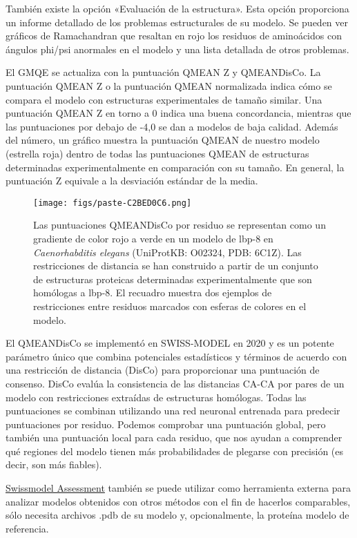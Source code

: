 También existe la opción «Evaluación de la estructura». Esta opción proporciona un informe detallado de los problemas estructurales de su modelo. Se pueden ver gráficos de Ramachandran que resaltan en rojo los residuos de aminoácidos con ángulos phi/psi anormales en el modelo y una lista detallada de otros problemas.

El GMQE se actualiza con la puntuación QMEAN Z y QMEANDisCo. La puntuación QMEAN Z o la puntuación QMEAN normalizada indica cómo se compara el modelo con estructuras experimentales de tamaño similar. Una puntuación QMEAN Z en torno a 0 indica una buena concordancia, mientras que las puntuaciones por debajo de -4,0 se dan a modelos de baja calidad. Además del número, un gráfico muestra la puntuación QMEAN de nuestro modelo (estrella roja) dentro de todas las puntuaciones QMEAN de estructuras determinadas experimentalmente en comparación con su tamaño. En general, la puntuación Z equivale a la desviación estándar de la media.

\begin{figure}[h]
\centering
\texttt{[image: figs/paste-C2BED0C6.png]}
\caption{Las puntuaciones QMEANDisCo por residuo se representan como un gradiente de color rojo a verde en un modelo de lbp-8 en \textit{Caenorhabditis elegans} (UniProtKB: O02324, PDB: 6C1Z). Las restricciones de distancia se han construido a partir de un conjunto de estructuras proteicas determinadas experimentalmente que son homólogas a lbp-8. El recuadro muestra dos ejemplos de restricciones entre residuos marcados con esferas de colores en el modelo. }
\end{figure}

El QMEANDisCo se implementó en SWISS-MODEL en 2020 y es un potente parámetro único que combina potenciales estadísticos y términos de acuerdo con una restricción de distancia (DisCo) para proporcionar una puntuación de consenso. DisCo evalúa la consistencia de las distancias CA-CA por pares de un modelo con restricciones extraídas de estructuras homólogas. Todas las puntuaciones se combinan utilizando una red neuronal entrenada para predecir puntuaciones por residuo. Podemos comprobar una puntuación global, pero también una puntuación local para cada residuo, que nos ayudan a comprender qué regiones del modelo tienen más probabilidades de plegarse con precisión (es decir, son más fiables).

\href{https://swissmodel.expasy.org/assess}{Swissmodel Assessment} también se puede utilizar como herramienta externa para analizar modelos obtenidos con otros métodos con el fin de hacerlos comparables, sólo necesita archivos .pdb de su modelo y, opcionalmente, la proteína modelo de referencia.

